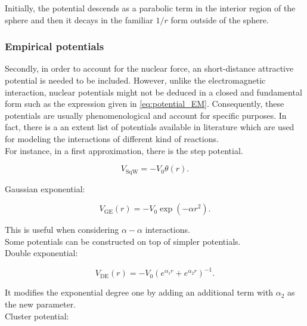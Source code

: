 \documentclass[openany]{book}
\begin{document}
Initially, the potential descends as a parabolic term in the interior region of the sphere and then it decays in the familiar $1/r$ form outside of the sphere. 

\subsubsection{Empirical potentials} \label{sub:potential_effective_empirical}

Secondly, in order to account for the nuclear force, an short-distance attractive potential is needed to be included. However, unlike the electromagnetic interaction, nuclear potentials might not be deduced  in a closed and fundamental form such as the expression given in \ref{eq:potential_EM}. Consequently, these  potentials are usually phenomenological and account for specific purposes. In fact, there is a an extent list of potentials available in literature which are used for modeling the interactions of different kind of reactions. \\

For instance, in a first approximation, there is the step potential.

\begin{equation} \label{eq:potential_squareWell}
	V_{\mathrm{SqW}} = -V_0\theta(r).
\end{equation}

Gaussian exponential: 

\begin{equation} \label{eq:potential_gaussianExponential}
	V_{\mathrm{GE}}(r) = - V_0 \exp{(-\alpha r^2 )}.
\end{equation}

This is useful when considering $\alpha-\alpha$ interactions.  \\

Some potentials can be constructed on top of simpler potentials. \\

Double exponential:

\begin{equation} \label{eq:potential_doubleExponential}
	V_{\mathrm{DE}}(r) = - V_0 \left(e^{\alpha_1 r} + e^{\alpha_2 r} \right)^{-1}.
\end{equation}

It modifies the exponential degree one by adding an additional term with $\alpha_2$ as the new parameter. \\

Cluster potential:
\end{document}

